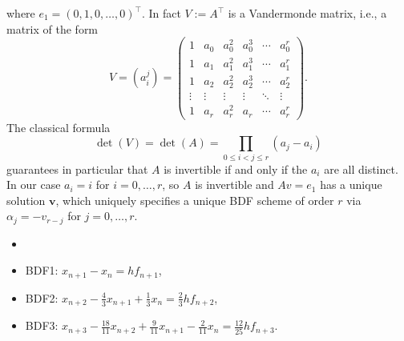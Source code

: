 where $e_1=(0,1,0, \ldots, 0)^{\top}$.
In fact $V:=A^{\top}$ is a Vandermonde matrix, i.e., a matrix of the form
$$
V=\left(a_i^j\right)=\left(\begin{array}{cccccc}
1 & a_0 & a_0^2 & a_0^3 & \cdots & a_0^r \\
1 & a_1 & a_1^2 & a_1^3 & \cdots & a_1^r \\
1 & a_2 & a_2^2 & a_2^3 & \cdots & a_2^r \\
\vdots & \vdots & \vdots & \vdots & \ddots & \vdots \\
1 & a_r & a_r^2 & a_r & \cdots & a_r^r
\end{array}\right) .
$$
The classical formula
$$
\operatorname{det}(V)=\operatorname{det}(A)=\prod_{0 \leq i<j \leq r}\left(a_j-a_i\right)
$$
guarantees in particular that $A$ is invertible if and only if the $a_i$ are all distinct. In our case $a_i=i$ for $i=0, \ldots, r$, so $A$ is invertible and $ Av=e_1 $ has a unique solution $\mathbf{v}$, which uniquely specifies a unique BDF scheme of order $r$ via $\alpha_j=-v_{r-j}$ for $j=0, \ldots, r$.


\begin{example}
[BDFs]
\label{eg: BDFs}
\begin{itemize}
    \item []
    \item BDF1: $ x_{n+1} - x_n = hf_{n+1} $,
    \item BDF2: $ x_{n+2} - \frac{4}{3}x_{n+1} + \frac{1}{3}x_{n} = \frac{2}{3}h f_{n+2} $, 
    \item BDF3: $ x_{n+3} -\frac{18}{11}x_{n+2}+ \frac{9}{11}x_{n+1} - \frac{2}{11}x_n = \frac{12}{25}h f_{n+3} $. 
\end{itemize}
\end{example}

 
 